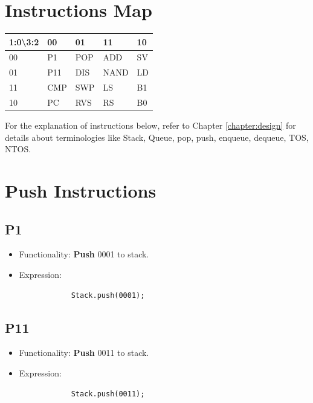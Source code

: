 \documentclass[11pt]{report}
\begin{document}
    \section{Instructions Map}
    \begin{table}[h]
        \begin{tabular}{|l|l|l|l|l|}
        \hline
        1:0\textbackslash{}3:2 & 00  & 01  & 11   & 10 \\ \hline
        00                     & P1  & POP & ADD  & SV \\ \hline
        01                     & P11  & DIS & NAND & LD \\ \hline
        11                     & CMP & SWP & LS   & B1 \\ \hline
        10                     & PC  & RVS & RS   & B0 \\ \hline
        \end{tabular}
    \end{table}
    For the explanation of instructions below, refer to Chapter \ref{chapter:design} for details
    about terminologies like Stack, Queue, pop, push, enqueue, dequeue, TOS, NTOS.
    \section{Push Instructions}
    \subsection{P1}
    \begin{itemize}
        \item Functionality: \textbf{Push} 0001 to stack.
        \item Expression:
        \begin{verbatim}
            Stack.push(0001);
        \end{verbatim}
    \end{itemize}

    \subsection{P11}
    \begin{itemize}
        \item Functionality: \textbf{Push} 0011 to stack.
        \item Expression:
        \begin{verbatim}
            Stack.push(0011);
        \end{verbatim}
    \end{itemize}
\end{document}
